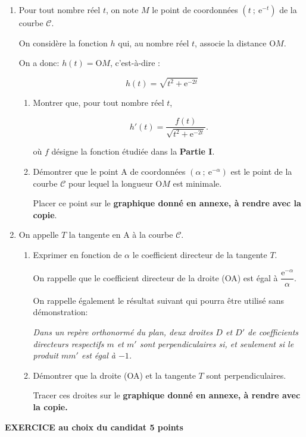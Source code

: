 \documentclass[11pt]{article}
\begin{document}
\begin{enumerate}
\item Pour tout nombre réel $t$, on note $M$ le point de coordonnées $\left(t~;~\text{e}^{-t}\right)$ de la courbe $\mathcal{C}$.

On considère la fonction $h$ qui, au nombre réel $t$, associe la distance O$M$.

On a donc: $h(t) = \text{O}M$, c'est-à-dire :

\[h(t) = \sqrt{t^2 + \text{e}^{-2t}}\]

	\begin{enumerate}
		\item Montrer que, pour tout nombre réel $t$,

\[h'(t) = \dfrac{f(t)}{\sqrt{t^2 + \text{e}^{-2t}}}.\]

où $f$ désigne la fonction étudiée dans la \textbf{Partie I}.
		\item Démontrer que le point A de coordonnées $\left(\alpha~;~\text{e}^{-\alpha}\right)$ est le point de la courbe $\mathcal{C}$ pour lequel la longueur O$M$ est minimale.
		

Placer ce point sur le \textbf{graphique donné en annexe, à rendre avec la copie}.
	\end{enumerate}
\item On appelle $T$ la tangente en A à la courbe $\mathcal{C}$.
	\begin{enumerate}
		\item Exprimer en fonction de $\alpha$ le coefficient directeur de la tangente $T$.
		
On rappelle que le coefficient directeur de la droite (OA) est égal à $\dfrac{\text{e}^{-\alpha}}{\alpha}$.

On rappelle également le résultat suivant qui pourra être utilisé sans démonstration:

\emph{Dans un repère orthonormé du plan, deux droites $D$ et $D'$ de coefficients directeurs respectifs $m$ et $m'$ sont perpendiculaires si, et seulement si le produit $mm'$ est égal à $-1$.}

		\item Démontrer que la droite (OA) et la tangente $T$ sont perpendiculaires. 
		
Tracer ces droites sur le \textbf{graphique donné en annexe, à rendre avec la copie.}
	\end{enumerate}
\end{enumerate}

\bigskip

\textbf{EXERCICE au choix du candidat \hfill 5 points}
\end{document}
